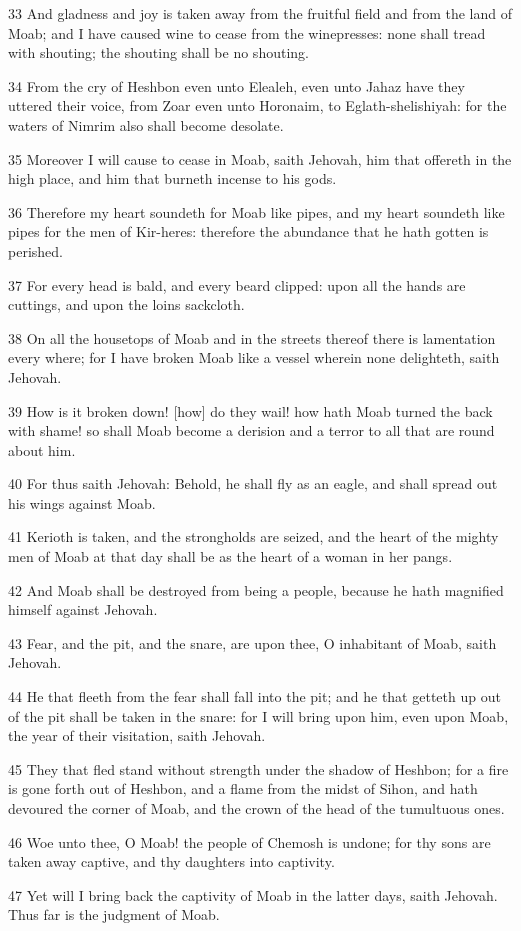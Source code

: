 \par 33 And gladness and joy is taken away from the fruitful field and from the land of Moab; and I have caused wine to cease from the winepresses: none shall tread with shouting; the shouting shall be no shouting.
\par 34 From the cry of Heshbon even unto Elealeh, even unto Jahaz have they uttered their voice, from Zoar even unto Horonaim, to Eglath-shelishiyah: for the waters of Nimrim also shall become desolate.
\par 35 Moreover I will cause to cease in Moab, saith Jehovah, him that offereth in the high place, and him that burneth incense to his gods.
\par 36 Therefore my heart soundeth for Moab like pipes, and my heart soundeth like pipes for the men of Kir-heres: therefore the abundance that he hath gotten is perished.
\par 37 For every head is bald, and every beard clipped: upon all the hands are cuttings, and upon the loins sackcloth.
\par 38 On all the housetops of Moab and in the streets thereof there is lamentation every where; for I have broken Moab like a vessel wherein none delighteth, saith Jehovah.
\par 39 How is it broken down! [how] do they wail! how hath Moab turned the back with shame! so shall Moab become a derision and a terror to all that are round about him.
\par 40 For thus saith Jehovah: Behold, he shall fly as an eagle, and shall spread out his wings against Moab.
\par 41 Kerioth is taken, and the strongholds are seized, and the heart of the mighty men of Moab at that day shall be as the heart of a woman in her pangs.
\par 42 And Moab shall be destroyed from being a people, because he hath magnified himself against Jehovah.
\par 43 Fear, and the pit, and the snare, are upon thee, O inhabitant of Moab, saith Jehovah.
\par 44 He that fleeth from the fear shall fall into the pit; and he that getteth up out of the pit shall be taken in the snare: for I will bring upon him, even upon Moab, the year of their visitation, saith Jehovah.
\par 45 They that fled stand without strength under the shadow of Heshbon; for a fire is gone forth out of Heshbon, and a flame from the midst of Sihon, and hath devoured the corner of Moab, and the crown of the head of the tumultuous ones.
\par 46 Woe unto thee, O Moab! the people of Chemosh is undone; for thy sons are taken away captive, and thy daughters into captivity.
\par 47 Yet will I bring back the captivity of Moab in the latter days, saith Jehovah. Thus far is the judgment of Moab.

